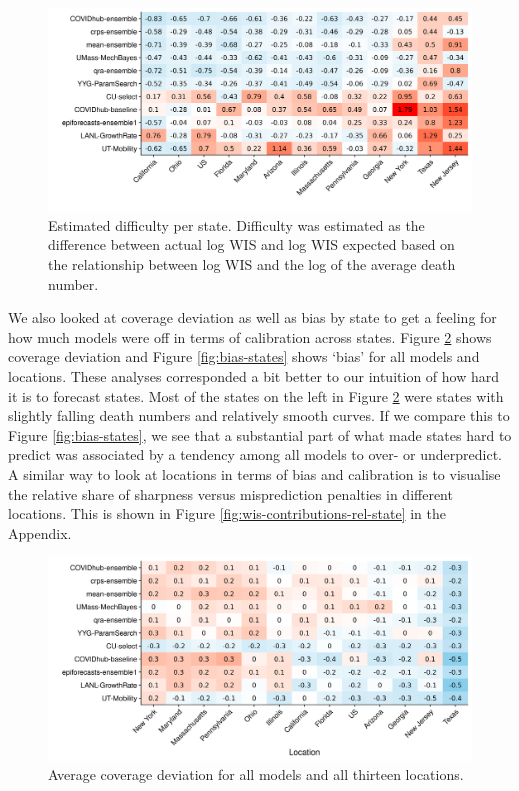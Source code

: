\documentclass[
]{book}
\begin{document}
\begin{figure}
\includegraphics[width=1\linewidth]{../visualisation/chapter-5-results/scenario-baseline/difficulty-states-heatmap} \caption{Estimated difficulty per state. Difficulty was estimated as the difference between actual log WIS and log WIS expected based on the relationship between log WIS and the log of the average death number.}\label{fig:dfficulty-states}
\end{figure}

We also looked at coverage deviation as well as bias by state to get a feeling for how much models were off in terms of calibration across states. Figure \ref{fig:coverage-deviation-states} shows coverage deviation and Figure \ref{fig:bias-states} shows `bias' for all models and locations. These analyses corresponded a bit better to our intuition of how hard it is to forecast states. Most of the states on the left in Figure \ref{fig:coverage-deviation-states} were states with slightly falling death numbers and relatively smooth curves. If we compare this to Figure \ref{fig:bias-states}, we see that a substantial part of what made states hard to predict was associated by a tendency among all models to over- or underpredict. A similar way to look at locations in terms of bias and calibration is to visualise the relative share of sharpness versus misprediction penalties in different locations. This is shown in Figure \ref{fig:wis-contributions-rel-state} in the Appendix.

\begin{figure}
\includegraphics[width=1\linewidth]{../visualisation/chapter-5-results/heatmap-model-coverage} \caption{Average coverage deviation for all models and all thirteen locations.}\label{fig:coverage-deviation-states}
\end{figure}
\end{document}
